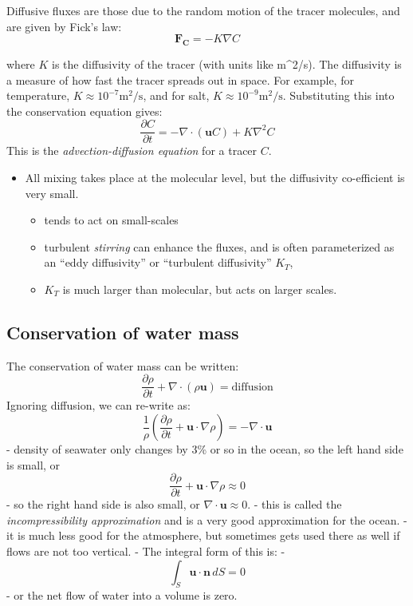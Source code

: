 Diffusive fluxes are those due to the random motion of the tracer
molecules, and are given by Fick's law: \[\mathbf{F_C} = -K \nabla C\]

where \(K\) is the diffusivity of the tracer (with units like m\^{}2/s).
The diffusivity is a measure of how fast the tracer spreads out in
space. For example, for temperature,
\(K \approx 10^{-7} \mathrm{m^2/s}\), and for salt,
\(K \approx 10^{-9} \mathrm{m^2/s}\). Substituting this into the
conservation equation gives:
\[\frac{\partial C}{\partial t} = - \nabla \cdot \left(\mathbf{u}C\right) + K \nabla^2 C\]
This is the \emph{advection-diffusion equation} for a tracer \(C\).

\begin{itemize}
\tightlist
\item
  All mixing takes place at the molecular level, but the diffusivity
  co-efficient is very small.

  \begin{itemize}
  \tightlist
  \item
    tends to act on small-scales
  \item
    turbulent \emph{stirring} can enhance the fluxes, and is often
    parameterized as an ``eddy diffusivity'' or ``turbulent
    diffusivity'' \(K_T\),
  \item
    \(K_T\) is much larger than molecular, but acts on larger scales.
  \end{itemize}
\end{itemize}

\subsection{Conservation of water
mass}\label{conservation-of-water-mass}

The conservation of water mass can be written:
\[\frac{\partial \rho}{\partial t} + \nabla \cdot (\rho \mathbf{u}) = \mathrm{diffusion}\]
Ignoring diffusion, we can re-write as:
\[\frac{1}{\rho} \left(\frac{\partial \rho}{\partial t} +\mathbf{u}\cdot\nabla\rho\right) = - \nabla \cdot \mathbf{u}\]
- density of seawater only changes by 3\% or so in the ocean, so the
left hand side is small, or
\[\frac{\partial \rho}{\partial t} +\mathbf{u}\cdot\nabla\rho \approx 0\]
- so the right hand side is also small, or
\(\nabla \cdot \mathbf{u} \approx 0\). - this is called the
\emph{incompressibility approximation} and is a very good approximation
for the ocean. - it is much less good for the atmosphere, but sometimes
gets used there as well if flows are not too vertical. - The integral
form of this is: - \[ \int_S \mathbf{u} \cdot \mathbf{n} \, dS = 0\] -
or the net flow of water into a volume is zero.

